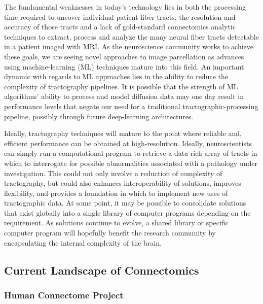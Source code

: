 The fundamental weaknesses in today’s technology lies in both the processing 
time required to uncover individual patient fiber tracts, the resolution and 
accuracy of those tracts and a lack of gold-standard connectomics analytic 
techniques to extract, process and analyze the many neural fiber tracts 
detectable in a patient imaged with MRI.  As the neuroscience community works to 
achieve these goals, we are seeing novel approaches to image parcellation as 
advances using machine-learning (ML) techniques mature into this field.  An 
important dynamic with regards to ML approaches lies in the ability to reduce 
the complexity of tractography pipelines.  It is possible that the strength of 
ML algorithms’ ability to process and model diffusion data may one day result in 
performance levels that negate our need for a traditional 
tractographic-processing pipeline, possibly through future deep-learning 
architectures.

Ideally, tractography techniques will mature to the point where reliable 
and, efficient performance can be obtained at high-resolution. Ideally, 
neuroscientists can simply run a computational program to retrieve a data rich 
array of tracts in which to interrogate for possible abnormalities associated 
with a pathology under investigation.  This could not only involve a reduction 
of complexity of tractography, but could also enhances interoperability of 
solutions, improves flexibility, and provides a foundation in which to implement 
new uses of tractographic data.  At some point, it may be possible to 
consolidate solutions that exist globally into a single library of computer 
programs depending on the requirement.  As solutions continue to evolve, a 
shared library or specific computer program will hopefully benefit the research 
community by encapsulating the internal complexity of the brain.

\subsection {Current Landscape of Connectomics}

\subsubsection {Human Connectome Project}

